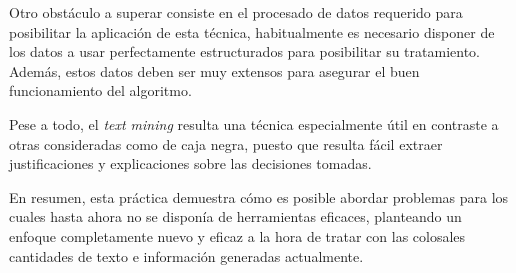 \documentclass[12pt,a4paper, xcolor=table]{article}
\begin{document}
\newpage

Otro obstáculo a superar consiste en el procesado de datos requerido para posibilitar la aplicación de esta técnica, habitualmente es necesario disponer de los datos a usar perfectamente estructurados para posibilitar su tratamiento. Además, estos datos deben ser muy extensos para asegurar el buen funcionamiento del algoritmo.

\vspace{2mm}

Pese a todo, el \textit{text mining} resulta una técnica especialmente útil en contraste a otras consideradas como de caja negra, puesto que resulta fácil extraer justificaciones y explicaciones sobre las decisiones tomadas.

\vspace{3mm}

En resumen, esta práctica demuestra cómo es posible abordar problemas para los cuales hasta ahora no se disponía de herramientas eficaces, planteando un enfoque completamente nuevo y eficaz a la hora de tratar con las colosales cantidades de texto e información generadas actualmente.


\clearpage




\end{document}
